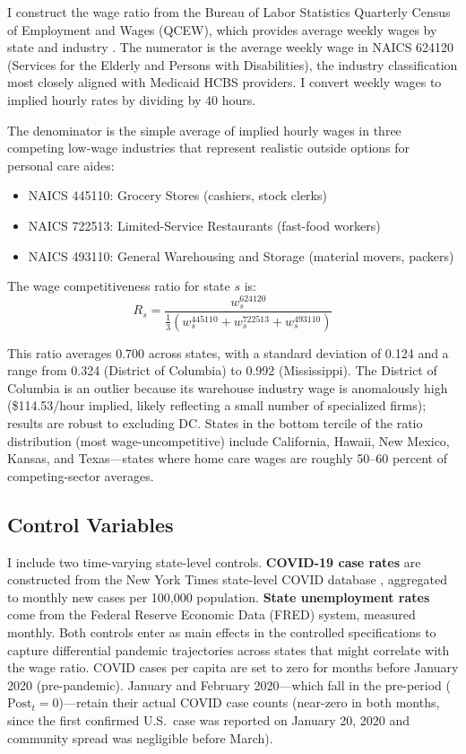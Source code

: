\documentclass[12pt]{article}
\begin{document}
I construct the wage ratio from the Bureau of Labor Statistics Quarterly Census of Employment and Wages (QCEW), which provides average weekly wages by state and industry \citep{bls2019qcew}. The numerator is the average weekly wage in NAICS 624120 (Services for the Elderly and Persons with Disabilities), the industry classification most closely aligned with Medicaid HCBS providers. I convert weekly wages to implied hourly rates by dividing by 40 hours.

The denominator is the simple average of implied hourly wages in three competing low-wage industries that represent realistic outside options for personal care aides:
\begin{itemize}
\item NAICS 445110: Grocery Stores (cashiers, stock clerks)
\item NAICS 722513: Limited-Service Restaurants (fast-food workers)
\item NAICS 493110: General Warehousing and Storage (material movers, packers)
\end{itemize}

The wage competitiveness ratio for state $s$ is:
\begin{equation}
R_s = \frac{w_s^{624120}}{\frac{1}{3}(w_s^{445110} + w_s^{722513} + w_s^{493110})}
\end{equation}

This ratio averages 0.700 across states, with a standard deviation of 0.124 and a range from 0.324 (District of Columbia) to 0.992 (Mississippi). The District of Columbia is an outlier because its warehouse industry wage is anomalously high (\$114.53/hour implied, likely reflecting a small number of specialized firms); results are robust to excluding DC. States in the bottom tercile of the ratio distribution (most wage-uncompetitive) include California, Hawaii, New Mexico, Kansas, and Texas---states where home care wages are roughly 50--60 percent of competing-sector averages.

\subsection{Control Variables}

I include two time-varying state-level controls. \textbf{COVID-19 case rates} are constructed from the New York Times state-level COVID database \citep{nyt2020covid}, aggregated to monthly new cases per 100,000 population. \textbf{State unemployment rates} come from the Federal Reserve Economic Data (FRED) system, measured monthly. Both controls enter as main effects in the controlled specifications to capture differential pandemic trajectories across states that might correlate with the wage ratio. COVID cases per capita are set to zero for months before January 2020 (pre-pandemic). January and February 2020---which fall in the pre-period ($\text{Post}_t = 0$)---retain their actual COVID case counts (near-zero in both months, since the first confirmed U.S.\ case was reported on January 20, 2020 and community spread was negligible before March).
\end{document}
